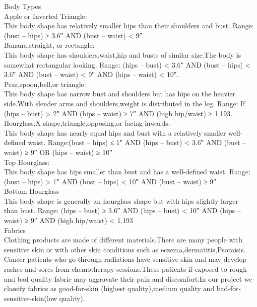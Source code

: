 \documentclass[11pt,journal,compsoc]{IEEEtran}
\begin{document}
Body Types \\

Apple or Inverted Triangle: \\
This body shape has relatively smaller hips than their shoulders and bust.
Range:  (bust – hips) ≥ 3.6″ AND (bust – waist) < 9″. \\

Banana,straight, or rectangle: \\
This body shape has shoulders,waist,hip and busts  of similar size.The body is somewhat rectangular looking.
Range: (hips – bust) < 3.6″ AND (bust – hips) < 3.6″ AND (bust – waist) < 9″ AND 
(hips – waist) < 10″. \\

Pear,spoon,bell,or triangle: \\
This body shape has narrow bust and shoulders but has hips on the heavier side.With slender arms and shoulders,weight is distributed in the leg.
Range: If (hips – bust) > 2″ AND (hips – waist) ≥ 7″ AND (high hip/waist) ≥ 1.193. \\

Hourglass,X shape,triangle,opposing,or facing inwards: \\
This body shape has nearly equal hips and bust with a relatively smaller well-defined waist.
Range:(bust – hips) ≤ 1″ AND (hips – bust) < 3.6″ AND (bust – waist) ≥ 9″ OR (hips – waist) ≥ 10″ \\

Top Hourglass: \\
This body shape has hips smaller than bust and has a well-defined waist.
Range: (bust – hips) > 1″ AND (bust – hips) < 10″ AND (bust – waist) ≥ 9″ \\

Bottom Hourglass \\
This body shape is generally an hourglass shape but with hips slightly larger than bust.
 Range: (hips – bust) ≥ 3.6″ AND (hips – bust) < 10″ AND (hips – waist) ≥ 9″ AND (high hip/waist) < 1.193 \\
 

Fabrics \\

Clothing products are made of different materials.There are many people with sensitive skin or with other skin conditions such as eczema,dermatitis,Psoraisis. Cancer patients who go through radiations have sensitive skin and may develop rashes and sores from chemotherapy sessions.These patients if exposed to rough and bad quality fabric may aggravate their pain and discomfort.In our project we classify fabrics as good-for-skin (highest quality),medium quality and bad-for-sensitive-skin(low quality). \\
\end{document}
